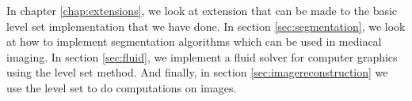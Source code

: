 In chapter \vref{chap:extensions}, we look at extension that can be made to the basic level set implementation that we have done. In section \vref{sec:segmentation}, we look at how to implement segmentation algorithms which can be used in mediacal imaging. In section \vref{sec:fluid}, we implement a fluid solver for computer graphics using the level set method. And finally, in section \vref{sec:imagereconstruction}  we use the level set to do computations on images.




